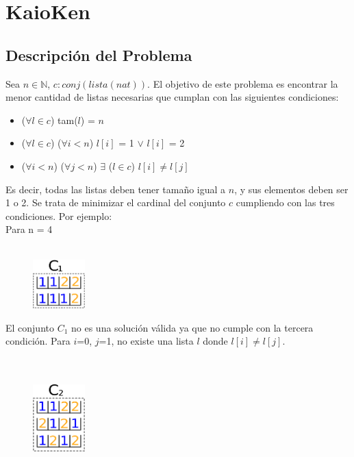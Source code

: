 \section{KaioKen}

	\subsection{Descripción del Problema}
		Sea $n \in \mathds{N}$, $c: conj(lista(nat))$. El objetivo de este problema es encontrar la menor cantidad de listas necesarias que cumplan con las siguientes condiciones: 
		    \begin{itemize}
                \item ($ \forall l \in c$) tam($l$) = $n$
                \item ($ \forall l \in c$) ($ \forall i < n$) $l[i]$ = 1 $\vee$ $l[i]$ = 2
                \item ($ \forall i < n$) ($ \forall j < n$) $\exists$ ($l \in c$) $l[i] \neq l[j]$
            \end{itemize}
    Es decir, todas las listas deben tener tamaño igual a $n$, y sus elementos deben ser 1 o 2. Se trata de minimizar el cardinal del conjunto $c$ cumpliendo con las tres condiciones. 
    Por ejemplo:\\
    
      Para n = 4  \\
    \\

\begin{figure}
  \vspace{-41pt}
  \begin{center}
    \includegraphics[width=2cm]{graficos/c1.png}
  \end{center}
\end{figure}

 El conjunto $C_{1}$ no es una solución válida ya que no cumple con la tercera condición. Para $i$=0, $j$=1, no existe una lista $l$ donde $l[i] \neq l[j]$.
\\
\\
\\

\begin{figure}
  \vspace{-41pt}
  \begin{center}
    \includegraphics[width=2cm]{graficos/c2.png}
  \end{center}
\end{figure}

